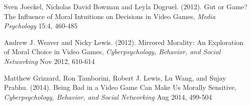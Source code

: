 \begin{thebibliography}{H}
	Sven Joeckel, Nicholas David Bowman and Leyla Dogruel. (2012). Gut or Game? The Influence of Moral Intuitions on Decisions in Video Games, \textit{Media Psychology} 15:4, 460-485
	
	Andrew J. Weaver and Nicky Lewis. (2012). Mirrored Morality: An Exploration of Moral Choice in Video Games, \textit{Cyberpsychology, Behavior, and Social Networking} Nov 2012, 610-614
	
	Matthew Grizzard, Ron Tamborini, Robert J. Lewis, Lu Wang, and Sujay Prabhu. (2014). Being Bad in a Video Game Can Make Us Morally Sensitive, \textit{Cyberpsychology, Behavior, and Social Networking} Aug 2014, 499-504
	
\end{thebibliography}